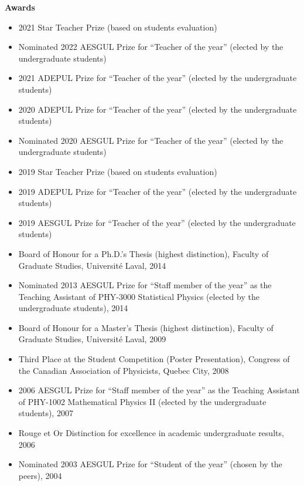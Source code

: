 \documentclass[11pt]{article}
\newcommand{\TitreSection}[1]{\colorbox{background}{\makebox[\textwidth-0.5em][c]{\Large\textrm{\textsc{#1}}}}\vspace{0.75\baselineskip}\\}
\begin{document}
%
%
%
\textbf{Awards}
%
\begin{itemize}
  \item 2021 Star Teacher Prize (based on students evaluation)
  \item Nominated 2022 AESGUL Prize for ``Teacher of the year'' (elected by the undergraduate students)
  \item 2021 ADEPUL Prize for ``Teacher of the year'' (elected by the undergraduate students)
  \item 2020 ADEPUL Prize for ``Teacher of the year'' (elected by the undergraduate students)
  \item Nominated 2020 AESGUL Prize for ``Teacher of the year'' (elected by the undergraduate students)
  \item 2019 Star Teacher Prize (based on students evaluation)
  \item 2019 ADEPUL Prize for ``Teacher of the year'' (elected by the undergraduate students)
  \item 2019 AESGUL Prize for ``Teacher of the year'' (elected by the undergraduate students)
  \item Board of Honour for a Ph.D.'s Thesis (highest distinction), Faculty of Graduate Studies, Universit\'e Laval, 2014
  \item Nominated 2013 AESGUL Prize for ``Staff member of the year'' as the Teaching Assistant of PHY-3000 Statistical Physics (elected by the undergraduate students), 2014
  \item Board of Honour for a Master's Thesis (highest distinction), Faculty of Graduate Studies, Universit\'e Laval, 2009
  \item Third Place at the Student Competition (Poster Presentation), Congress of the Canadian Association of Physicists, Quebec City, 2008
  \item 2006 AESGUL Prize for ``Staff member of the year'' as the Teaching Assistant of PHY-1002 Mathematical Physics II (elected by the undergraduate students), 2007
  \item Rouge et Or Distinction for excellence in academic undergraduate results, 2006
  \item Nominated 2003 AESGUL Prize for ``Student of the year'' (chosen by the peers), 2004
\end{itemize} \vspace{0.75\baselineskip}
%
%
%
%
%
\TitreSection{Mentoring}
\end{document}
